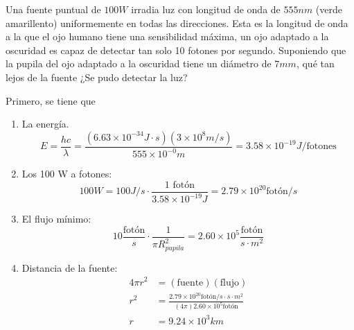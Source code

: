 \begin{problema}[Problema 10]
    Una fuente puntual de $100 W$ irradia luz con longitud de onda de $555 nm$ (verde amarillento) uniformemente en todas las direcciones. Esta es la longitud de onda a la que el ojo humano tiene una sensibilidad máxima, un ojo adaptado a la oscuridad es capaz de detectar tan solo 10 fotones por segundo. Suponiendo que la pupila del ojo adaptado a la oscuridad tiene un diámetro de $7 mm$, qué tan lejos de la fuente ¿Se pudo detectar la luz?
    \begin{sol}
        Primero, se tiene que 
        \begin{enumerate}
            \item La energía.
            $$E=\frac{hc}{\lambda }= \frac{(6.63\times 10^{-34}J\cdot s)(3\times 10^8 m/s)}{555\times 10^{-0}m}=3.58\times 10^{-19}J/\text{fotones}$$
            \item Los 100 W a fotones:
            $$100W = 100 J/s\cdot \frac{1\text{ fotón}}{3.58\times 10^{-19}J} = 2.79\times 10^{20} \text{fotón}/s$$
            \item El flujo mínimo: 
            $$10 \frac{\text{fotón}}{s}\cdot \frac{1}{\pi R_{pupila}^2}=2.60\times 10^5 \frac{\text{fotón}}{s\cdot m^2}$$
            \item Distancia de la fuente:
            \begin{align*}
                4\pi r^2 &= (\text{fuente})(\text{flujo})\\
                r^2 &= \frac{ 2.79\times 10^{20} \text{fotón}/s\cdot s\cdot m^2}{(4\pi )2.60\times 10^5 \text{fotón}}\\
                r&= 9.24\times 10^3 km
            \end{align*}
            
        \end{enumerate}
        
    \end{sol}
\end{problema}
